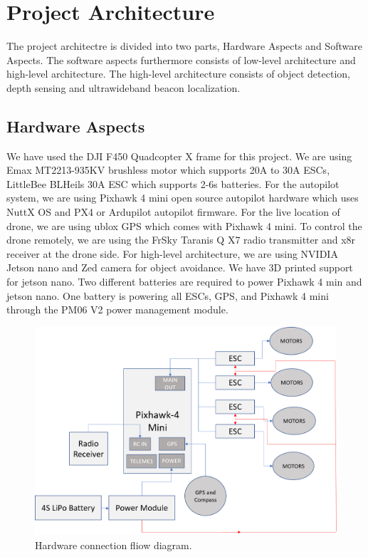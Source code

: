 \documentclass{IEEEtran}
\begin{document}
\section{Project Architecture}\label{sec:problem}
The project architectre is divided into two parts, Hardware Aspects and Software Aspects. The software aspects furthermore consists of low-level architecture and high-level architecture. The high-level architecture consists of object detection, depth sensing and ultrawideband beacon localization.

\subsection{Hardware Aspects}
We have used the DJI F450 Quadcopter X frame for this project. We are using Emax MT2213-935KV brushless motor which supports 20A to 30A ESCs, LittleBee BLHeils 30A ESC which supports 2-6s batteries. For the autopilot system, we are using Pixhawk 4 mini open source autopilot hardware which uses NuttX OS and PX4 or Ardupilot autopilot firmware. For the live location of drone, we are using ublox GPS which comes with Pixhawk 4 mini. To control the drone remotely, we are using the FrSky Taranis Q X7 radio transmitter and x8r receiver at the drone side. For high-level architecture, we are using NVIDIA Jetson nano and Zed camera for object avoidance. We have 3D printed support for jetson nano. Two different batteries are required to power Pixhawk 4 min and jetson nano. One battery is powering all ESCs, GPS, and Pixhawk 4 mini through the PM06 V2 power management module.

\begin{figure}[htb]
\centering
\includegraphics[width=1\linewidth]{fig/hardware_connection.png}
\caption{Hardware connection fliow diagram.} \label{fig.structure}
\end{figure}
\end{document}
